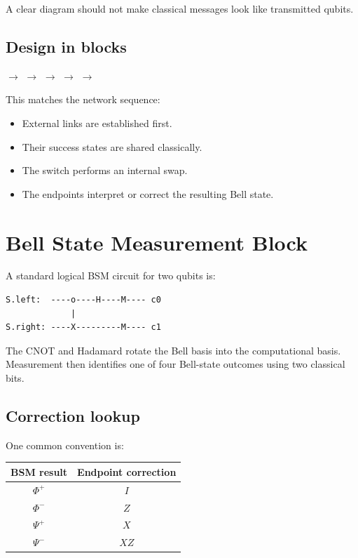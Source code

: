 \documentclass[11pt]{article}
\begin{document}
A clear diagram should not make classical messages look like transmitted qubits.

\subsection{Design in blocks}

\begin{center}
\(\rightarrow\)
\(\rightarrow\)
\(\rightarrow\)
\(\rightarrow\)
\(\rightarrow\)
\end{center}

This matches the network sequence:

\begin{itemize}
    \item External links are established first.
    \item Their success states are shared classically.
    \item The switch performs an internal swap.
    \item The endpoints interpret or correct the resulting Bell state.
\end{itemize}

\section{Bell State Measurement Block}

A standard logical BSM circuit for two qubits is:

\begin{verbatim}
S.left:  ----o----H----M---- c0
             |
S.right: ----X---------M---- c1
\end{verbatim}

The CNOT and Hadamard rotate the Bell basis into the computational basis. Measurement then identifies one of four Bell-state outcomes using two classical bits.

\subsection{Correction lookup}

One common convention is:

\begin{center}
\begin{tabular}{|c|c|}
\hline
\textbf{BSM result} & \textbf{Endpoint correction} \\
\hline
\(\Phi^+\) & \(I\) \\
\(\Phi^-\) & \(Z\) \\
\(\Psi^+\) & \(X\) \\
\(\Psi^-\) & \(XZ\) \\
\hline
\end{tabular}
\end{center}
\end{document}
